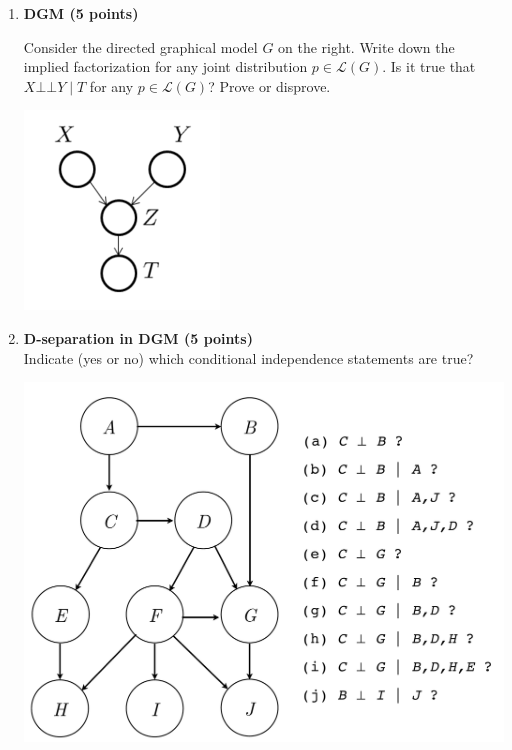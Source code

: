 \documentclass[12pt]{article}
\newcommand{\1}{{\bf 1}}
\newcommand{\indep}{\bot\!\!\!\bot}
\begin{document}
\begin{enumerate}

\item {\bf DGM (5 points)}  \\
\begin{minipage}[b]{0.7\textwidth}
Consider the directed graphical model $G$ on the right. 
Write down the implied factorization for any joint distribution $p \in \mathcal{L}(G)$.
Is it true that $X \indep Y \mid T$ for any $p \in \mathcal{L}(G)$? Prove or disprove.
\end{minipage}
\begin{minipage}{0.3\textwidth}
\vspace{-10mm}
\hspace{0.6cm}\includegraphics[scale=.5]{hwk3_GMex.png} \vspace{-10mm}
\end{minipage}

\item {\bf D-separation in DGM (5 points)} \\
Indicate (yes or no) which conditional independence statements are true?
\begin{center}
\vspace{-0.2cm} \includegraphics[scale=0.25]{hwk3_d-sep.pdf}
\end{center}


\end{enumerate}
\end{document}
